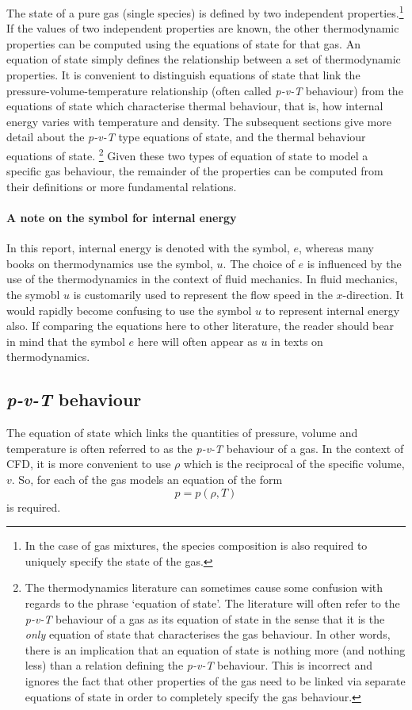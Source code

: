 The state of a pure gas (single species) is defined by two independent
properties.\footnote{In the case of gas mixtures, the species composition
is also required to uniquely specify the state of the gas.}
If the values of two independent properties are known, 
the other thermodynamic properties can be computed using the
equations of state for that gas.
An equation of state simply defines the relationship
between a set of thermodynamic properties.
It is convenient to distinguish equations of state
that link the pressure-volume-temperature relationship
(often called \textit{p-v-T} behaviour) from the equations of state
which characterise thermal behaviour, that is, how internal
energy varies with temperature and density.
The subsequent sections give more detail about the \textit{p-v-T} type
equations of state, and the thermal behaviour equations of state.
\footnote{The thermodynamics literature can sometimes cause some confusion
with regards to the phrase `equation of state'.
The literature will often refer to the \textit{p-v-T} behaviour of a gas as
its equation of state in the sense that it is the \emph{only}
equation of state that characterises the gas behaviour.
In other words, there is an implication that an equation of state is
nothing more (and nothing less) than a relation defining the \textit{p-v-T}
behaviour.
This is incorrect and ignores the fact that other properties of the gas
need to be linked via separate equations of state in order to completely
specify the gas behaviour.}
Given these two types of equation of state to model a specific gas
behaviour, the remainder of the properties can be computed from their
definitions or more fundamental relations.

\paragraph{A note on the symbol for internal energy}
In this report, internal energy is denoted with the symbol, $e$, whereas
many books on thermodynamics use the symbol, $u$.
The choice of $e$ is influenced by the use of the thermodynamics in the
context of fluid mechanics.
In fluid mechanics, the symobl $u$ is customarily used to represent
the flow speed in the $x$-direction.
It would rapidly become confusing to use the symbol $u$ to represent
internal energy also.
If comparing the equations here to other literature, the reader should bear
in mind that the symbol $e$ here will
often appear as $u$ in texts on thermodynamics.

\subsection{\textit{p-v-T} behaviour}
The equation of state which links the quantities of pressure, volume and temperature
is often referred to as the \textit{p-v-T} behaviour of a gas.
In the context of CFD, it is more convenient to use $\rho$ which is the
reciprocal of the specific volume, $v$.
So, for each of the gas models an equation of the form
\[ p = p(\rho, T) \]
is required.

